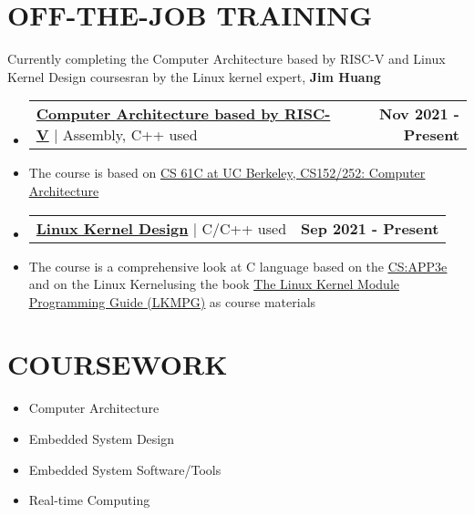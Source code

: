 \documentclass[letterpaper,11pt]{article}
\makeatletter
\newcommand{\resumeItem}[1]{
  \item\small{
    {#1 \vspace{-0.5pt}}
  }
}
\newcommand{\resumeProjectHeading}[2]{
    \item
    \begin{tabular*}{1.001\textwidth}{l@{\extracolsep{\fill}}r}
      \small#1 & \textbf{\small #2}\\
    \end{tabular*}%
}
\newcommand{\resumeSubHeadingListStart}{\begin{itemize}[leftmargin=0.0in, label={}]}
\newcommand{\resumeSubHeadingListEnd}{\end{itemize}}
\makeatother
\begin{document}
\section{OFF-THE-JOB TRAINING}
    {Currently completing the Computer Architecture based by RISC-V and Linux Kernel Design courses\newline ran by the Linux kernel expert, \textbf{Jim Huang} \href{http://wiki.csie.ncku.edu.tw/User/jserv}{\raisebox{-0.1\height}\faExternalLink}}
    \vspace{-14pt}
    \resumeSubHeadingListStart
        \resumeProjectHeading
          {{\textbf{\large{\underline{Computer Architecture based by RISC-V}}} \href{http://wiki.csie.ncku.edu.tw/arch/schedule}{\raisebox{-0.1\height}\faExternalLink}} $|$ \large{Assembly, C++ used}}{Nov 2021 - Present}
            \resumeItem{The course is based on \textcolor{accent} {\href{https://cs61c.org/fa21/} {\underline{\normalsize{CS 61C at UC Berkeley, CS152/252: Computer Architecture}}}}}
        \vspace{-10pt}
        \resumeProjectHeading
          {{\textbf{\large{\underline{Linux Kernel Design}}} \href{https://hackmd.io/@asahsieh/linux_kernel}{\raisebox{-0.1\height}\faExternalLink }} $|$ \large{C/C++ used}}{Sep 2021 - Present}
            \resumeItem{The course is a comprehensive look at C language based on the \textcolor{accent} {\href{https://csapp.cs.cmu.edu/} {\underline{\normalsize{CS:APP3e}}}} and
            on the Linux Kernel\newline using the book \textcolor{accent} {\href{https://sysprog21.github.io/lkmpg/?fbclid=IwAR2_2G0TwJpx3uiIafaLAxKUVLz_7FIem0lqw8Up59qlplgOZZmqiXHtTGY} {\underline{\normalsize{The Linux Kernel Module Programming Guide (LKMPG)}}}} as course materials}
    \resumeSubHeadingListEnd


\section{COURSEWORK}
        \begin{multicols}{4}
            \begin{itemize}[itemsep=-2pt, parsep=5pt]
                \item Computer Architecture
                \item Embedded System Design
                \item Embedded System Software/Tools
                \item Real-time Computing
            \end{itemize}
        \end{multicols}
        \vspace*{2.0\multicolsep}
    
\end{document}
